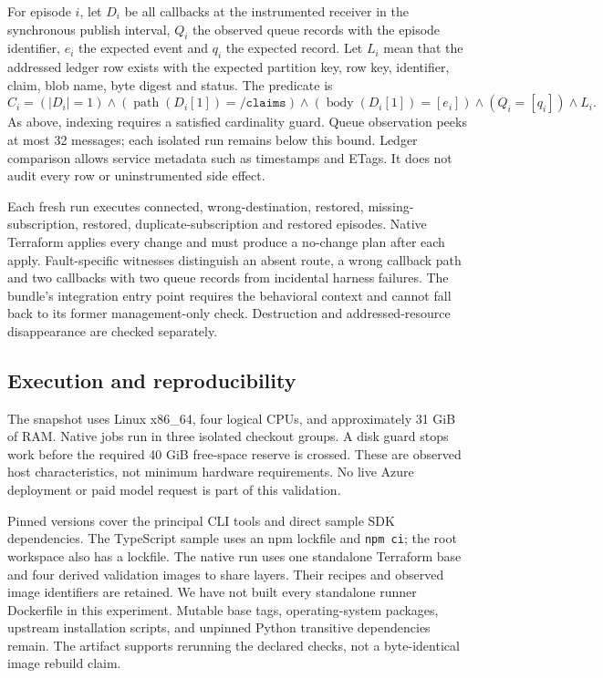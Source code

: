 \documentclass[10pt,a4paper]{article}
\begin{document}
For episode $i$, let $D_i$ be all callbacks at the instrumented receiver in the synchronous publish interval, $Q_i$ the observed queue records with the episode identifier, $e_i$ the expected event and $q_i$ the expected record. Let $L_i$ mean that the addressed ledger row exists with the expected partition key, row key, identifier, claim, blob name, byte digest and status. The predicate is
\begin{equation}
C_i=(|D_i|=1)\land(\operatorname{path}(D_i[1])=\texttt{/claims})
\land(\operatorname{body}(D_i[1])=[e_i])\land(Q_i=[q_i])\land L_i.
\end{equation}
As above, indexing requires a satisfied cardinality guard. Queue observation peeks at most 32 messages; each isolated run remains below this bound. Ledger comparison allows service metadata such as timestamps and ETags. It does not audit every row or uninstrumented side effect.

Each fresh run executes connected, wrong-destination, restored, missing-subscription, restored, duplicate-subscription and restored episodes. Native Terraform applies every change and must produce a no-change plan after each apply. Fault-specific witnesses distinguish an absent route, a wrong callback path and two callbacks with two queue records from incidental harness failures. The bundle's integration entry point requires the behavioral context and cannot fall back to its former management-only check. Destruction and addressed-resource disappearance are checked separately.

\subsection{Execution and reproducibility}
The snapshot uses Linux x86\_64, four logical CPUs, and approximately 31 GiB of RAM. Native jobs run in three isolated checkout groups. A disk guard stops work before the required 40 GiB free-space reserve is crossed. These are observed host characteristics, not minimum hardware requirements. No live Azure deployment or paid model request is part of this validation.

Pinned versions cover the principal CLI tools and direct sample SDK dependencies. The TypeScript sample uses an npm lockfile and \texttt{npm ci}; the root workspace also has a lockfile. The native run uses one standalone Terraform base and four derived validation images to share layers. Their recipes and observed image identifiers are retained. We have not built every standalone runner Dockerfile in this experiment. Mutable base tags, operating-system packages, upstream installation scripts, and unpinned Python transitive dependencies remain. The artifact supports rerunning the declared checks, not a byte-identical image rebuild claim.
\end{document}
